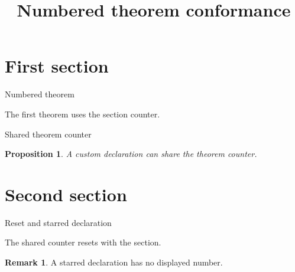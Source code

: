 \documentclass[aspectratio=169,envcountsect]{beamer}
\title{Numbered theorem conformance}
\date{}
\newtheorem{proposition}[theorem]{Proposition}
\theoremstyle{definition}
\newtheorem*{remark}{Remark}
\begin{document}
\section{First section}

\begin{frame}{Numbered theorem}
  \begin{theorem}
    The first theorem uses the section counter.
  \end{theorem}
\end{frame}

\begin{frame}{Shared theorem counter}
  \begin{proposition}
    A custom declaration can share the theorem counter.
  \end{proposition}
\end{frame}

\section{Second section}

\begin{frame}{Reset and starred declaration}
  \begin{lemma}
    The shared counter resets with the section.
  \end{lemma}

  \begin{remark}
    A starred declaration has no displayed number.
  \end{remark}
\end{frame}
\end{document}
